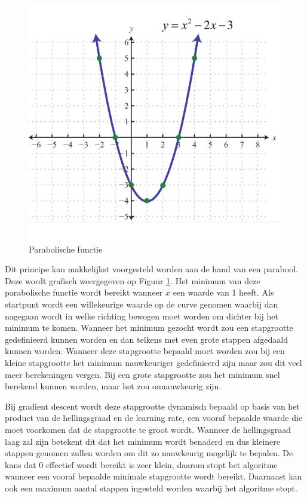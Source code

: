 \begin{figure}
    \centering
    \caption{Parabolische functie}
    \label{fig:parabolicfunction}
    \includegraphics[width=0.7\linewidth]{parabolicfunction}
\end{figure}

Dit principe kan makkelijkst voorgesteld worden aan de hand van een parabool. Deze wordt grafisch weergegeven op Figuur \ref{fig:parabolicfunction}. Het minimum van deze parabolische functie wordt bereikt wanneer $x$ een waarde van 1 heeft. 
Als startpunt wordt een willekeurige waarde op de curve genomen waarbij dan nagegaan wordt in welke richting bewogen moet worden om dichter bij het minimum te komen. Wanneer het minimum gezocht wordt zou een stapgrootte gedefinieerd kunnen worden en dan telkens met even grote stappen afgedaald kunnen worden. Wanneer deze stapgrootte bepaald moet worden zou bij een kleine stapgrootte het minimum nauwkeuriger gedefinieerd zijn maar zou dit veel meer berekeningen vergen. Bij een grote stapgrootte zou het minimum snel berekend kunnen worden, maar het zou onnauwkeurig zijn. 

Bij gradient descent wordt deze stapgrootte dynamisch bepaald op basis van het product van de hellingsgraad en de learning rate, een vooraf bepaalde waarde die moet voorkomen dat de stapgrootte te groot wordt. Wanneer de hellingsgraad laag zal zijn betekent dit dat het minimum wordt benaderd en dus kleinere stappen genomen zullen worden om dit zo nauwkeurig mogelijk te bepalen. De kans dat 0 effectief wordt bereikt is zeer klein, daarom stopt het algoritme wanneer een vooraf bepaalde minimale stapgrootte wordt bereikt. Daarnaast kan ook een maximum aantal stappen ingesteld worden waarbij het algoritme stopt. 

